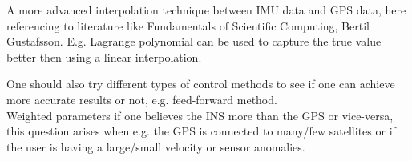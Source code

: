 A more advanced interpolation technique between IMU data and GPS data, here referencing to literature like Fundamentals of Scientific Computing, Bertil Gustafsson. E.g. Lagrange polynomial can be used to capture the true value better then using a linear interpolation.\newline


One should also try different types of control methods to see if one can achieve more accurate results or not, e.g. feed-forward method.\\
Weighted parameters if one believes the INS more than the GPS or vice-versa, this question arises when e.g. the GPS is connected to many/few satellites or if the user is having a large/small velocity or sensor anomalies. \\ \\




